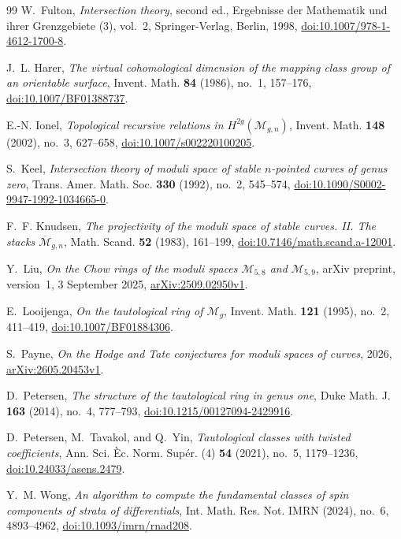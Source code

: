 \documentclass[12pt,reqno]{amsart}
\theoremstyle{definition}
\theoremstyle{remark}
\begin{document}
\begin{thebibliography}{99}
W.~Fulton,
\emph{Intersection theory}, second ed.,
Ergebnisse der Mathematik und ihrer Grenzgebiete (3), vol.~2,
Springer-Verlag, Berlin, 1998,
\href{https://doi.org/10.1007/978-1-4612-1700-8}
{doi:10.1007/978-1-4612-1700-8}.

J.~L. Harer,
\emph{The virtual cohomological dimension of the mapping class group of an
orientable surface},
Invent. Math. \textbf{84} (1986), no.~1, 157--176,
\href{https://doi.org/10.1007/BF01388737}{doi:10.1007/BF01388737}.

E.-N. Ionel,
\emph{Topological recursive relations in $H^{2g}(\mathcal M_{g,n})$},
Invent. Math. \textbf{148} (2002), no.~3, 627--658,
\href{https://doi.org/10.1007/s002220100205}
{doi:10.1007/s002220100205}.

S.~Keel,
\emph{Intersection theory of moduli space of stable $n$-pointed curves of
genus zero},
Trans. Amer. Math. Soc. \textbf{330} (1992), no.~2, 545--574,
\href{https://doi.org/10.1090/S0002-9947-1992-1034665-0}
{doi:10.1090/S0002-9947-1992-1034665-0}.

F.~F. Knudsen,
\emph{The projectivity of the moduli space of stable curves. II. The stacks
$\overline{\mathcal M}_{g,n}$},
Math. Scand. \textbf{52} (1983), 161--199,
\href{https://doi.org/10.7146/math.scand.a-12001}
{doi:10.7146/math.scand.a-12001}.

Y.~Liu,
\emph{On the Chow rings of the moduli spaces $\mathcal M_{5,8}$ and
$\mathcal M_{5,9}$},
arXiv preprint, version~1, 3 September 2025,
\href{https://arxiv.org/abs/2509.02950}{arXiv:2509.02950v1}.

E.~Looijenga,
\emph{On the tautological ring of $\mathcal M_g$},
Invent. Math. \textbf{121} (1995), no.~2, 411--419,
\href{https://doi.org/10.1007/BF01884306}
{doi:10.1007/BF01884306}.

S.~Payne,
\emph{On the Hodge and Tate conjectures for moduli spaces of curves},
2026,
\href{https://arxiv.org/abs/2605.20453}{arXiv:2605.20453v1}.

D.~Petersen,
\emph{The structure of the tautological ring in genus one},
Duke Math. J. \textbf{163} (2014), no.~4, 777--793,
\href{https://doi.org/10.1215/00127094-2429916}
{doi:10.1215/00127094-2429916}.

D.~Petersen, M.~Tavakol, and Q.~Yin,
\emph{Tautological classes with twisted coefficients},
Ann. Sci. \`Ec. Norm. Sup\'er. (4) \textbf{54} (2021), no.~5, 1179--1236,
\href{https://doi.org/10.24033/asens.2479}{doi:10.24033/asens.2479}.

Y.~M. Wong,
\emph{An algorithm to compute the fundamental classes of spin components
of strata of differentials},
Int. Math. Res. Not. IMRN (2024), no.~6, 4893--4962,
\href{https://doi.org/10.1093/imrn/rnad208}
{doi:10.1093/imrn/rnad208}.

\end{thebibliography}
\end{document}
